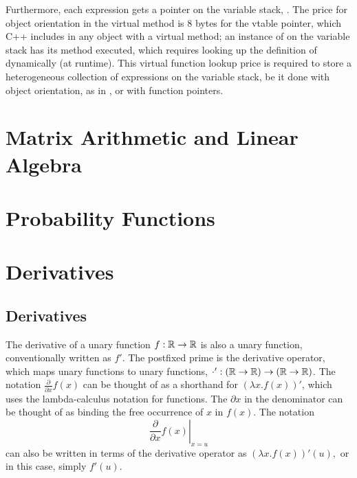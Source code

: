 \documentclass[10pt]{article}
\begin{document}
Furthermore, each expression gets a pointer on the variable stack,
.  The price for object orientation in the virtual
 method is 8 bytes for the vtable pointer, which C++
includes in any object with a virtual method; an instance of
 on the variable stack has its  method
executed, which requires looking up the definition of 
dynamically (at runtime).  This virtual function lookup price is
required to store a heterogeneous collection of expressions on the
variable stack, be it done with object orientation, as in
, or with function pointers.












\section{Matrix Arithmetic and Linear Algebra}


\section{Probability Functions}






\clearpage
\appendix

\section{Derivatives}\label{derivative-definitions.section}

\subsection{Derivatives}

The derivative of a unary function $f:\mathbb{R} \rightarrow \mathbb{R}$ is
also a unary function, conventionally written as $f'$.  The postfixed prime is
the derivative operator, which maps unary functions to unary
functions, $\cdot' : \left(\mathbb{R} \rightarrow \mathbb{R}\right)
\rightarrow \left(\mathbb{R} \rightarrow \mathbb{R}\right)$.  The notation
$\frac{\partial}{\partial x} f(x)$ can be thought of as a shorthand
for $\left( \lambda x. f(x) \right)'$, which uses the lambda-calculus
notation for functions. The $\partial x$ in the denominator can be
thought of as binding the free occurrence of $x$ in $f(x)$.  The
notation
\[
\left. \frac{\partial}{\partial x} f(x) \right|_{x = u}
\]
can also be written in terms of the derivative operator as $\left(
  \lambda x. f(x) \right)'(u),$ or in this case, simply $f'(u)$.
\end{document}
